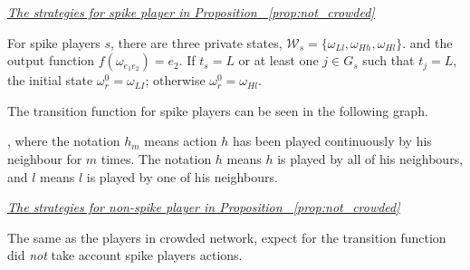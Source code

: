 \documentclass[12pt,letter]{article}
\theoremstyle{remark}
\theoremstyle{remark}
\theoremstyle{claim}
\begin{document}
\noindent\underline{\emph{The strategies for spike player in Proposition ~\ref{prop:not_crowded}}}

For spike players $s$, there are three private states, $\mathcal{W}_s=\{\omega_{Ll},\omega_{Hh},\omega_{Hl}\}$.  and the output function $f(\omega_{e_1e_2})=e_2$.  If $t_s=L$ or at least one $j\in G_s$ such that $t_j=L$, the initial state $\omega^0_r=\omega_{LI}$; otherwise $\omega^0_r=\omega_{Hl}$. 

The transition function for spike players can be seen in the following graph. 


\begin{center}
\end{center}
, where the notation $h_{m}$ means action $h$ has been played continuously by his neighbour for $m$ times. The notation $h$ means $h$ is played by all of his neighbours, and $l$ means $l$ is played by one of his neighbours. 

\bigskip

\noindent\underline{\emph{The strategies for non-spike player in Proposition ~\ref{prop:not_crowded}}}

The same as the players in crowded network, expect for the transition function did \textit{not} take account spike players actions.

\bigskip
\end{document}
